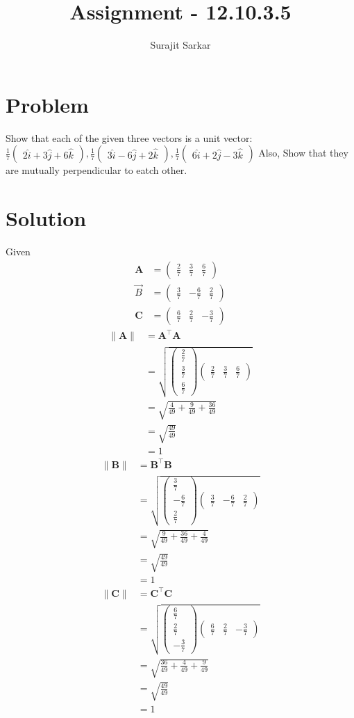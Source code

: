 \documentclass[journal,12pt,twocolumn]{IEEEtran}
\title{\mytitle}
\title{
Assignment - 12.10.3.5
}
\author{Surajit Sarkar}
\newcommand{\myvec}[1]{\ensuremath{\begin{pmatrix}#1\end{pmatrix}}}
\let\vec\mathbf
\begin{document}
\maketitle
\tableofcontents
\bigskip
\section{\textbf{Problem}}
Show that each of the given three vectors is a unit vector:$\frac{1}{7}\myvec{2\hat{i}+3\hat{j}+6\hat{k}},\frac{1}{7}\myvec{3\hat{i}-6\hat{j}+2\hat{k}},\frac{1}{7}\myvec{6\hat{i}+2\hat{j}-3\hat{k}}$
Also, Show that they are mutually perpendicular to eatch other.
\section{\textbf{Solution}}
Given
\begin{align}
\vec{A}&=\myvec{\frac{2}{7}&\frac{3}{7}&\frac{6}{7}} \\ 
\Vec{B}&=\myvec{\frac{3}{7}&-\frac{6}{7}&\frac{2}{7}} \\ 
\vec{C}&=\myvec{\frac{6}{7}&\frac{2}{7}&-\frac{3}{7}}
\end{align}
\begin{align}
\|\vec{A}\|&=\vec{A}^{\top}\vec{A}\\
&=\sqrt{\myvec{\frac{2}{7}\\ \frac{3}{7}\\ \frac{6}{7}}\myvec{\frac{2}{7}&\frac{3}{7}&\frac{6}{7}}}\\
&=\sqrt{\frac{4}{49}+\frac{9}{49}+\frac{36}{49}}\\
&=\sqrt{\frac{49}{49}}\\
&=1
\end{align}
\begin{align}
\|\vec{B}\|&=\vec{B}^{\top}\vec{B}\\
&=\sqrt{\myvec{\frac{3}{7}\\ -\frac{6}{7}\\ \frac{2}{7}}\myvec{\frac{3}{7}&-\frac{6}{7}&\frac{2}{7}}}\\
&=\sqrt{\frac{9}{49}+\frac{36}{49}+\frac{4}{49}}\\
&=\sqrt{\frac{49}{49}}\\
&=1
\end{align}
\begin{align}
\|\vec{C}\|&=\vec{C}^{\top}\vec{C}\\
&=\sqrt{\myvec{\frac{6}{7}\\ \frac{2}{7}\\ -\frac{3}{7}}\myvec{\frac{6}{7}&\frac{2}{7}&-\frac{3}{7}}}\\
&=\sqrt{\frac{36}{49}+\frac{4}{49}+\frac{9}{49}}\\
&=\sqrt{\frac{49}{49}}\\
&=1
\end{align}
\end{document}
